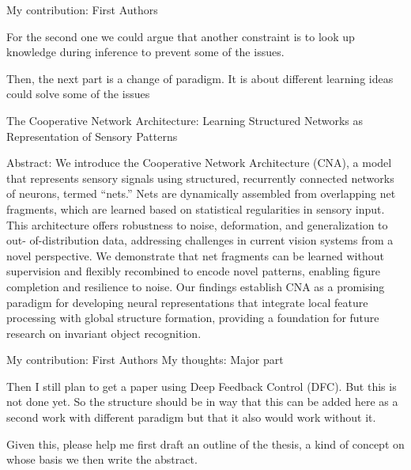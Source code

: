 My contribution: First Authors

For the second one we could argue that another constraint is to look up knowledge during inference to prevent some of the issues.


Then, the next part is a change of paradigm. It is about different learning ideas could solve some of the issues


The Cooperative Network Architecture: Learning Structured Networks as Representation of Sensory Patterns

Abstract: We introduce the Cooperative Network Architecture (CNA), a model that represents sensory signals
using structured, recurrently connected networks of neurons, termed “nets.” Nets are dynamically
assembled from overlapping net fragments, which are learned based on statistical regularities in
sensory input. This architecture offers robustness to noise, deformation, and generalization to out-
of-distribution data, addressing challenges in current vision systems from a novel perspective. We
demonstrate that net fragments can be learned without supervision and flexibly recombined to encode
novel patterns, enabling figure completion and resilience to noise. Our findings establish CNA as a
promising paradigm for developing neural representations that integrate local feature processing with
global structure formation, providing a foundation for future research on invariant object recognition.

My contribution: First Authors
My thoughts: Major part


Then I still plan to get a paper using Deep Feedback Control (DFC). But this is not done yet. So the structure should be in way that this can be added here as a second work with different paradigm but that it also would work without it.


Given this, please help me first draft an outline of the thesis, a kind of concept on whose basis we then write the abstract.

